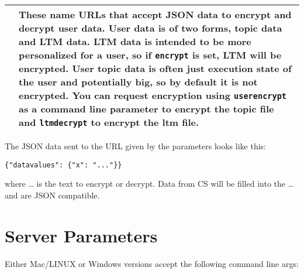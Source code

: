 \documentclass[]{article}
\begin{document}
\begin{longtable}[]{@{}ll@{}}
\begin{minipage}[t]{0.18\columnwidth}
\end{minipage} & \begin{minipage}[t]{0.76\columnwidth}\raggedright\strut
These name URLs that accept JSON data to encrypt and decrypt user data.
User data is of two forms, topic data and LTM data. LTM data is intended
to be more personalized for a user, so if \texttt{encrypt} is set, LTM
will be encrypted. User topic data is often just execution state of the
user and potentially big, so by default it is not encrypted. You can
request encryption using \texttt{userencrypt} as a command line
parameter to encrypt the topic file and \texttt{ltmdecrypt} to encrypt
the ltm file.\strut
\end{minipage}\tabularnewline
\bottomrule
\end{longtable}

The JSON data sent to the URL given by the parameters looks like this:

\begin{verbatim}
{"datavalues": {"x": "..."}} 
\end{verbatim}

where \ldots{} is the text to encrypt or decrypt. Data from CS will be
filled into the \ldots{} and are JSON compatible.

\section{Server Parameters}\label{server-parameters}

Either Mac/LINUX or Windows versions accept the following command line
args:
\end{document}
